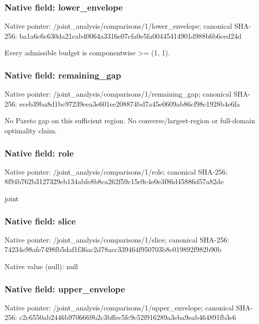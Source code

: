 \documentclass[10pt,a4paper]{article}
\begin{document}
\subsubsection{Native field: lower\_\allowbreak{}envelope}
Native pointer: /joint\_\allowbreak{}analysis/comparisons/1/lower\_\allowbreak{}envelope; canonical SHA-256: ba1a6c6c630da21cab40064a3316e07cfa0e5fa00445414901d988b6b6ced24d

\begingroup\raggedright\sloppy Every admissible budget is componentwise >=\allowbreak{} (1,\allowbreak{} 1).\par\endgroup

\subsubsection{Native field: remaining\_\allowbreak{}gap}
Native pointer: /joint\_\allowbreak{}analysis/comparisons/1/remaining\_\allowbreak{}gap; canonical SHA-256: eceb39ba8d1bc97239eea3e601ee208874bd7a45e0609ab86cf98c1928b4e6fa

\begingroup\raggedright\sloppy No Pareto gap on this sufficient region. No converse/\allowbreak{}largest-region or full-domain optimality claim.\par\endgroup

\subsubsection{Native field: role}
Native pointer: /joint\_\allowbreak{}analysis/comparisons/1/role; canonical SHA-256: 8f94b762b3127329eb134abfe8b8ca262f59c15e9c4e0e3f86d45886d57a82de

\begingroup\raggedright\sloppy joint\par\endgroup

\subsubsection{Native field: slice}
Native pointer: /joint\_\allowbreak{}analysis/comparisons/1/slice; canonical SHA-256: 74234e98afe7498fb5daf1f36ac2d78acc339464f950703b8c019892f982b90b

Native value (null): null

\subsubsection{Native field: upper\_\allowbreak{}envelope}
Native pointer: /joint\_\allowbreak{}analysis/comparisons/1/upper\_\allowbreak{}envelope; canonical SHA-256: c2c6550ab2446b9706669b2c3bffec5fc9c52f916289a3eba9eab464891fb3e6
\end{document}
